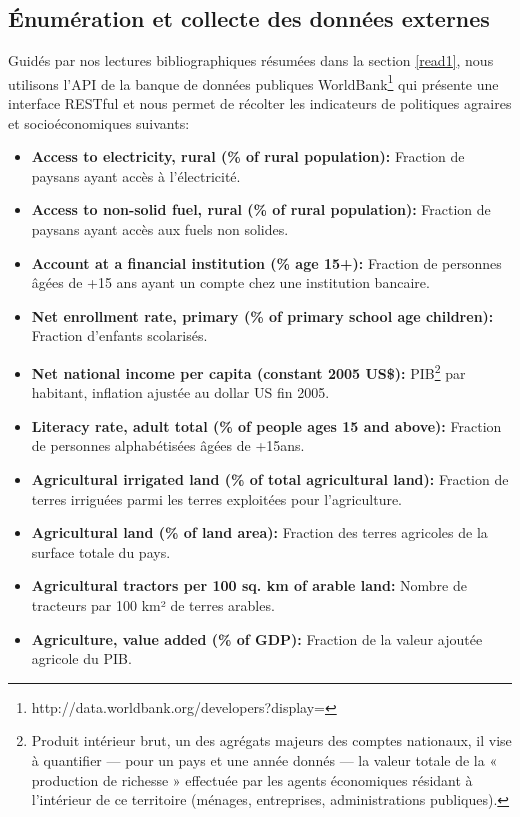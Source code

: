 	\subsection{Énumération et collecte des données externes}\label{exoList}
			Guidés par nos lectures bibliographiques résumées dans la section \ref{read1}, nous utilisons l'API de la banque de données publiques WorldBank\footnote{http://data.worldbank.org/developers?display=} qui présente une interface RESTful et nous permet de récolter les indicateurs de politiques agraires et socioéconomiques suivants:
	\begin{itemize}
		\item \textbf{ Access to electricity, rural (\% of rural population):} Fraction de paysans ayant accès à l'électricité.
		\item \textbf{ Access to non-solid fuel, rural (\% of rural population):} Fraction de paysans ayant accès aux fuels non solides.
		\item \textbf{ Account at a financial institution (\% age 15+):} Fraction de personnes âgées de +15 ans ayant un compte chez une institution bancaire.
		\item \textbf{ Net enrollment rate, primary (\% of primary school age children):} Fraction d'enfants scolarisés.
		\item \textbf{ Net national income per capita (constant 2005 US\$):} PIB\footnote{Produit intérieur brut, un des agrégats majeurs des comptes nationaux, il vise à quantifier — pour un pays et une année donnés — la valeur totale de la « production de richesse » effectuée par les agents économiques résidant à l’intérieur de ce territoire (ménages, entreprises, administrations publiques).} par habitant, inflation ajustée au dollar US fin 2005.
		\item \textbf{ Literacy rate, adult total (\% of people ages 15 and above):} Fraction de personnes alphabétisées âgées de +15ans.
		\item \textbf{ Agricultural irrigated land (\% of total agricultural land):} Fraction de terres irriguées parmi les terres exploitées pour l'agriculture.
		\item \textbf{ Agricultural land (\% of land area):} Fraction des terres agricoles de la surface totale du pays.
		\item \textbf{ Agricultural tractors per 100 sq. km of arable land:} Nombre de tracteurs par 100 km² de terres arables.
		\item \textbf{ Agriculture, value added (\% of GDP):} Fraction de la valeur ajoutée agricole du PIB.

\end{itemize}
